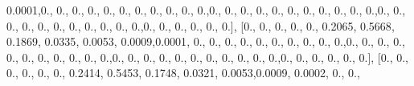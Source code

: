 \documentclass[
]{book}
\newenvironment{Shaded}{\begin{snugshade}}{\end{snugshade}}
\newcommand{\FloatTok}[1]{\textcolor[rgb]{0.00,0.00,0.81}{#1}}
\newcommand{\NormalTok}[1]{#1}
\begin{document}
\begin{Shaded}
\begin{Highlighting}[]
\FloatTok{0.0001}\NormalTok{,}\FloatTok{0.}\NormalTok{, }\FloatTok{0.}\NormalTok{, }\FloatTok{0.}\NormalTok{, }\FloatTok{0.}\NormalTok{, }\FloatTok{0.}\NormalTok{, }\FloatTok{0.}\NormalTok{, }\FloatTok{0.}\NormalTok{, }\FloatTok{0.}\NormalTok{, }\FloatTok{0.}\NormalTok{, }\FloatTok{0.}\NormalTok{, }\FloatTok{0.}\NormalTok{,}\FloatTok{0.}\NormalTok{, }\FloatTok{0.}\NormalTok{, }\FloatTok{0.}\NormalTok{, }\FloatTok{0.}\NormalTok{, }\FloatTok{0.}\NormalTok{, }\FloatTok{0.}\NormalTok{, }\FloatTok{0.}\NormalTok{,}
\FloatTok{0.}\NormalTok{, }\FloatTok{0.}\NormalTok{, }\FloatTok{0.}\NormalTok{, }\FloatTok{0.}\NormalTok{,}\FloatTok{0.}\NormalTok{, }\FloatTok{0.}\NormalTok{, }\FloatTok{0.}\NormalTok{, }\FloatTok{0.}\NormalTok{, }\FloatTok{0.}\NormalTok{, }\FloatTok{0.}\NormalTok{, }\FloatTok{0.}\NormalTok{, }\FloatTok{0.}\NormalTok{, }\FloatTok{0.}\NormalTok{, }\FloatTok{0.}\NormalTok{, }\FloatTok{0.}\NormalTok{,}\FloatTok{0.}\NormalTok{, }\FloatTok{0.}\NormalTok{, }\FloatTok{0.}\NormalTok{, }\FloatTok{0.}\NormalTok{, }\FloatTok{0.}\NormalTok{,}
\FloatTok{0.}\NormalTok{], [}\FloatTok{0.}\NormalTok{, }\FloatTok{0.}\NormalTok{, }\FloatTok{0.}\NormalTok{, }\FloatTok{0.}\NormalTok{, }\FloatTok{0.}\NormalTok{, }\FloatTok{0.2065}\NormalTok{, }\FloatTok{0.5668}\NormalTok{, }\FloatTok{0.1869}\NormalTok{, }\FloatTok{0.0335}\NormalTok{, }\FloatTok{0.0053}\NormalTok{, }\FloatTok{0.0009}\NormalTok{,}\FloatTok{0.0001}\NormalTok{,}
\FloatTok{0.}\NormalTok{, }\FloatTok{0.}\NormalTok{, }\FloatTok{0.}\NormalTok{, }\FloatTok{0.}\NormalTok{, }\FloatTok{0.}\NormalTok{, }\FloatTok{0.}\NormalTok{, }\FloatTok{0.}\NormalTok{, }\FloatTok{0.}\NormalTok{, }\FloatTok{0.}\NormalTok{, }\FloatTok{0.}\NormalTok{,}\FloatTok{0.}\NormalTok{, }\FloatTok{0.}\NormalTok{, }\FloatTok{0.}\NormalTok{, }\FloatTok{0.}\NormalTok{, }\FloatTok{0.}\NormalTok{, }\FloatTok{0.}\NormalTok{, }\FloatTok{0.}\NormalTok{, }\FloatTok{0.}\NormalTok{, }\FloatTok{0.}\NormalTok{, }\FloatTok{0.}\NormalTok{,}
\FloatTok{0.}\NormalTok{,}\FloatTok{0.}\NormalTok{, }\FloatTok{0.}\NormalTok{, }\FloatTok{0.}\NormalTok{, }\FloatTok{0.}\NormalTok{, }\FloatTok{0.}\NormalTok{, }\FloatTok{0.}\NormalTok{, }\FloatTok{0.}\NormalTok{, }\FloatTok{0.}\NormalTok{, }\FloatTok{0.}\NormalTok{, }\FloatTok{0.}\NormalTok{, }\FloatTok{0.}\NormalTok{,}\FloatTok{0.}\NormalTok{, }\FloatTok{0.}\NormalTok{, }\FloatTok{0.}\NormalTok{, }\FloatTok{0.}\NormalTok{, }\FloatTok{0.}\NormalTok{, }\FloatTok{0.}\NormalTok{], [}\FloatTok{0.}\NormalTok{, }\FloatTok{0.}\NormalTok{,}
\FloatTok{0.}\NormalTok{, }\FloatTok{0.}\NormalTok{, }\FloatTok{0.}\NormalTok{, }\FloatTok{0.}\NormalTok{, }\FloatTok{0.2414}\NormalTok{, }\FloatTok{0.5453}\NormalTok{, }\FloatTok{0.1748}\NormalTok{, }\FloatTok{0.0321}\NormalTok{, }\FloatTok{0.0053}\NormalTok{,}\FloatTok{0.0009}\NormalTok{, }\FloatTok{0.0002}\NormalTok{, }\FloatTok{0.}\NormalTok{, }\FloatTok{0.}\NormalTok{,}

\end{Highlighting}
\end{Shaded}
\end{document}

